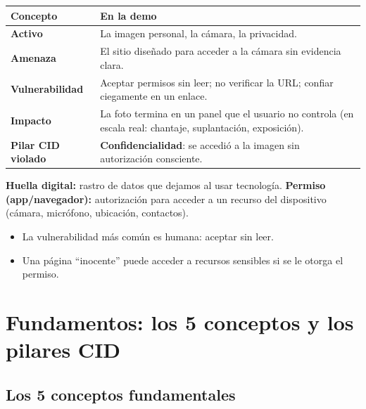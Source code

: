 \documentclass[12pt,a4paper]{article}
\begin{document}
\begin{tabularx}{\textwidth}{|>{\bfseries}p{3.4cm}|X|}
\hline
\rowcolor{grisClaro}
Concepto & En la demo \\
\hline
Activo & La imagen personal, la c\'amara, la privacidad. \\
\hline
Amenaza & El sitio dise\~nado para acceder a la c\'amara sin evidencia clara. \\
\hline
Vulnerabilidad & Aceptar permisos sin leer; no verificar la URL; confiar ciegamente en un enlace. \\
\hline
Impacto & La foto termina en un panel que el usuario no controla (en escala real: chantaje, suplantaci\'on, exposici\'on). \\
\hline
Pilar CID violado & \textbf{Confidencialidad}: se accedi\'o a la imagen sin autorizaci\'on consciente. \\
\hline
\end{tabularx}

\begin{cajaDefinicion}
\textbf{Huella digital:} rastro de datos que dejamos al usar tecnolog\'ia.
\textbf{Permiso (app/navegador):} autorizaci\'on para acceder a un recurso del
dispositivo (c\'amara, micr\'ofono, ubicaci\'on, contactos).
\end{cajaDefinicion}

\begin{cajaResumen}
\begin{itemize}
  \item La vulnerabilidad m\'as com\'un es humana: aceptar sin leer.
  \item Una p\'agina ``inocente'' puede acceder a recursos sensibles si se le otorga el permiso.
\end{itemize}
\end{cajaResumen}

\section{Fundamentos: los 5 conceptos y los pilares CID}

\subsection{Los 5 conceptos fundamentales}
\end{document}
